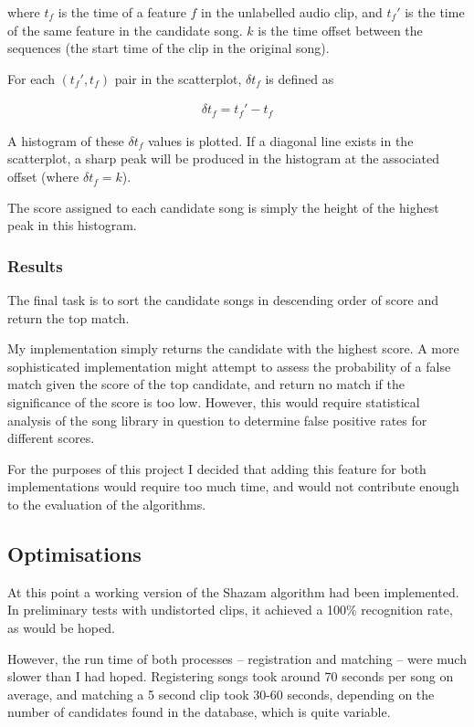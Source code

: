 \documentclass[12pt,a4paper,twoside,openright]{report}
\begin{document}
where $t_f$ is the time of a feature $f$ in the unlabelled audio clip, and $t_f'$ is the time of the same feature in the candidate song. $k$ is the time offset between the sequences (the start time of the clip in the original song).

For each $(t_f',t_f)$ pair in the scatterplot, $\delta t_f$ is defined as

\begin{align*}
  \delta t_f = t_f' - t_f
\end{align*}

A histogram of these $\delta t_f$ values is plotted. If a diagonal line exists in the scatterplot, a sharp peak will be produced in the histogram at the associated offset (where $\delta t_f = k$).

The score assigned to each candidate song is simply the height of the highest peak in this histogram.


\subsubsection{Results}

The final task is to sort the candidate songs in descending order of score and return the top match. 

My implementation simply returns the candidate with the highest score. A more sophisticated implementation might attempt to assess the probability of a false match given the score of the top candidate, and return no match if the significance of the score is too low. However, this would require statistical analysis of the song library in question to determine false positive rates for different scores.

For the purposes of this project I decided that adding this feature for both implementations would require too much time, and would not contribute enough to the evaluation of the algorithms.


\subsection{Optimisations}
\label{section:shazamoptimisations}

At this point a working version of the Shazam algorithm had been implemented. In preliminary tests with undistorted clips, it achieved a 100\% recognition rate, as would be hoped.

However, the run time of both processes -- registration and matching -- were much slower than I had hoped. Registering songs took around 70 seconds per song on average, and matching a 5 second clip took 30-60 seconds, depending on the number of candidates found in the database, which is quite variable.
\end{document}
